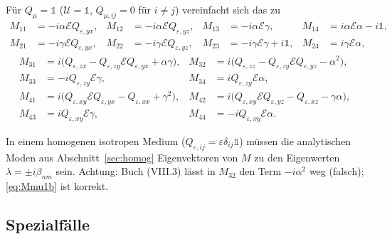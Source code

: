Für $Q_\mu=\mathbb 1$ ($\mathcal U=\mathbb 1$, $Q_{\mu,ij}=0$ für $i\neq j$) vereinfacht sich das zu
\begin{equation}
\begin{aligned}
  M_{11}&=-i\alpha\mathcal EQ_{\varepsilon,yx}, & M_{12}&=-i\alpha\mathcal EQ_{\varepsilon,yz},
  & M_{13}&=-i\alpha\mathcal E\gamma, & M_{14}&=i\alpha\mathcal E\alpha-i\mathbb 1,\\
  M_{21}&=-i\gamma\mathcal EQ_{\varepsilon,yx}, & M_{22}&=-i\gamma\mathcal EQ_{\varepsilon,yz},
  & M_{23}&=-i\gamma\mathcal E\gamma+i\mathbb 1, & M_{24}&=i\gamma\mathcal E\alpha,
\end{aligned}
\label{eq:Mmu1a}
\end{equation}
\begin{equation}
\begin{aligned}
  M_{31}&=i\big(Q_{\varepsilon,zx}-Q_{\varepsilon,zy}\mathcal EQ_{\varepsilon,yx}+\alpha\gamma\big), &
  M_{32}&=i\big(Q_{\varepsilon,zz}-Q_{\varepsilon,zy}\mathcal EQ_{\varepsilon,yz}-\alpha^2\big),\\
  M_{33}&=-iQ_{\varepsilon,zy}\mathcal E\gamma, & M_{34}&=iQ_{\varepsilon,zy}\mathcal E\alpha,\\
  M_{41}&=i\big(Q_{\varepsilon,xy}\mathcal EQ_{\varepsilon,yx}-Q_{\varepsilon,xx}+\gamma^2\big), &
  M_{42}&=i\big(Q_{\varepsilon,xy}\mathcal EQ_{\varepsilon,yz}-Q_{\varepsilon,xz}-\gamma\alpha\big),\\
  M_{43}&=iQ_{\varepsilon,xy}\mathcal E\gamma, & M_{44}&=-iQ_{\varepsilon,xy}\mathcal E\alpha .
\end{aligned}
\label{eq:Mmu1b}
\end{equation}
\begin{tcolorbox}[title=Prüfpunkt (Unit-Test \texttt{test\_propagation\_matrix})]
In einem homogenen isotropen Medium ($Q_{\varepsilon,ij}=\varepsilon\delta_{ij}\mathbb 1$) müssen die
analytischen Moden aus Abschnitt~\ref{sec:homog} Eigenvektoren von $M$ zu den Eigenwerten
$\lambda=\pm i\beta_{nm}$ sein. Achtung: Buch (VIII.3) lässt in $M_{32}$ den Term $-i\alpha^2$ weg
(falsch); \eqref{eq:Mmu1b} ist korrekt.
\end{tcolorbox}

\subsection{Spezialfälle}
